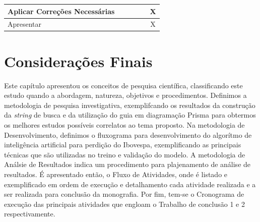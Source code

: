 \begin{table}[H]
\begin{tabular}{@{}lccccc@{}}
Aplicar Correções Necessárias            &                                     &                                     &                                     &                                     & X                                   \\ \midrule
Apresentar                               &                                     &                                     &                                     &                                     & X                                   \\ \bottomrule
\end{tabular}
\end{table}


\section{Considerações Finais}
\label{considfinal}



Este capítulo apresentou os conceitos de pesquisa científica, classificando este estudo quando a abordagem, natureza, objetivos e procedimentos. Definimos a metodologia de pesquisa investigativa, exemplifcando os resultados da construção da \textit{string} de busca e da utilização do guia em diagramação Prisma para obtermos os melhores estudos possíveis correlatos ao tema proposto. Na metodologia de Desenvolvimento, definimos o fluxograma para desenvolvimento do algorítmo de inteligência artificial para perdição do Ibovespa, exemplificando as principais técnicas que são utilizadas no treino e validação do modelo. A metodologia de Análsie de Resultados indica um procedimento para plajenamento de análise de resultados. É apresentado então, o Fluxo de Atividades, onde é listado e exemplificado em ordem de execução e detalhamento cada atividade realizada e a ser realizada para conclusão da monografia. Por fim, tem-se o Cronograma de execução das principais atividades que engloam o Trabalho de conclusão 1 e 2 respectivamente.